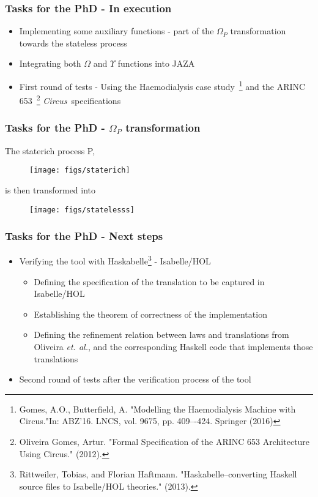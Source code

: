 \documentclass{beamer}
\def\Circus{{\sf\slshape{Circus}}}
\begin{document}
\begin{frame}
\frametitle{Tasks for the PhD - In execution}
\begin{itemize}
  \item Implementing some auxiliary functions - part of the $\Omega_P$ transformation towards the stateless process
  \item Integrating both $\Omega$ and $\Upsilon$ functions into JAZA
  \item First round of tests - Using the Haemodialysis case study~\footnote{Gomes, A.O., Butterfield, A. "Modelling the Haemodialysis Machine with Circus."In: ABZ’16. LNCS, vol. 9675, pp. 409–-424. Springer (2016)} and the ARINC 653~\footnote{Oliveira Gomes, Artur. "Formal Specification of the ARINC 653 Architecture Using Circus." (2012).} \Circus\ specifications
  \end{itemize}
\end{frame}



\begin{frame}
\frametitle{Tasks for the PhD - $\Omega_P$ transformation}
The staterich process P,
\begin{figure}[htbp]
    \texttt{[image: figs/staterich]}
 \end{figure}
 is then transformed into 
 \begin{figure}[htbp]
    \texttt{[image: figs/statelesss]}
 \end{figure}
\end{frame}

\begin{frame}
\frametitle{Tasks for the PhD - Next steps}
\begin{itemize}
 \item Verifying the tool with Haskabelle\footnote{Rittweiler, Tobias, and Florian Haftmann. "Haskabelle--converting Haskell source files to Isabelle/HOL theories." (2013).} - Isabelle/HOL
  \begin{itemize}
    \item Defining the specification of the translation to be captured in Isabelle/HOL
    \item Establishing the theorem of correctness of the implementation
    \item Defining the refinement relation between laws and translations from Oliveira \emph{et. al.},
and the corresponding Haskell code that implements those translations
  \end{itemize} 
  \item Second round of tests after the verification process of the tool
  \end{itemize}
\end{frame}
\end{document}
